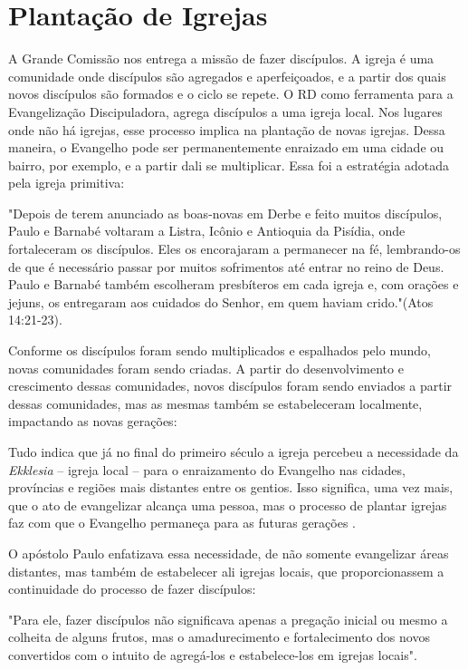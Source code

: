 \documentclass[12pt,openright,oneside,a4paper]{abntex2}
\begin{document}
\section{Plantação de Igrejas}

A Grande Comissão nos entrega a missão de fazer discípulos. A igreja é uma comunidade onde discípulos são agregados e aperfeiçoados, e a partir dos quais novos discípulos são formados e o ciclo se repete. O RD como ferramenta para a Evangelização Discipuladora, agrega discípulos a uma igreja local. Nos lugares onde não há igrejas, esse processo implica na plantação de novas igrejas. Dessa maneira, o Evangelho pode ser permanentemente enraizado em uma cidade ou bairro, por exemplo, e a partir dali se multiplicar\cite[p. 99,100]{brandao}. Essa foi a estratégia adotada pela igreja primitiva: 

\begin{citacao}"Depois de terem anunciado as boas-novas em Derbe e feito muitos discípulos, Paulo e Barnabé voltaram a Listra, Icônio e Antioquia da Pisídia, onde fortaleceram os discípulos. Eles os encorajaram a permanecer na fé, lembrando-os de que é necessário passar por muitos sofrimentos até entrar no reino de Deus. Paulo e Barnabé também escolheram presbíteros em cada igreja e, com orações e jejuns, os entregaram aos cuidados do Senhor, em quem haviam crido."(Atos 14:21-23).\end{citacao}

Conforme os discípulos foram sendo multiplicados e espalhados pelo mundo, novas comunidades foram sendo criadas. A partir do desenvolvimento e crescimento dessas comunidades, novos discípulos foram sendo enviados a partir dessas comunidades, mas as mesmas também se estabeleceram localmente, impactando as novas gerações:

\begin{citacao}Tudo indica que já no final do primeiro século a igreja percebeu a necessidade da \textit{Ekklesia} – igreja local – para o enraizamento do Evangelho nas cidades, províncias e regiões mais distantes entre os gentios. Isso significa, uma vez mais, que o ato de evangelizar alcança uma pessoa, mas o processo de plantar igrejas	faz com que o Evangelho permaneça para as futuras gerações \cite[p. 101]{brandao}.\end{citacao}

O apóstolo Paulo enfatizava essa necessidade, de não somente evangelizar áreas distantes, mas também de estabelecer ali igrejas locais, que proporcionassem a continuidade do processo de fazer discípulos: \begin{citacao}"Para ele, fazer discípulos não significava apenas a pregação inicial ou mesmo a colheita de alguns frutos, mas o amadurecimento e fortalecimento dos novos convertidos com o intuito de agregá-los e estabelece-los em igrejas locais"\cite[p. 101]{brandao}.\end{citacao}
\end{document}

